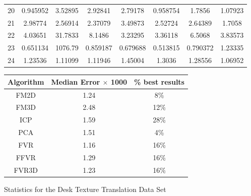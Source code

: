 \begin{figure}
\begin{tabular}{cccccccc}
20 & 0.945952 & 3.52895 & 2.92841 & 2.79178 & 0.958754 & 1.7856 & 1.07923\\
21 & 2.98774 & 2.56914 & 2.37079 & 3.49873 & 2.52724 & 2.64389 & 1.7058\\
22 & 4.03651 & 31.7833 & 8.1486 & 3.23295 & 3.36118 & 6.5068 & 3.83573\\
23 & 0.651134 & 1076.79 & 0.859187 & 0.679688 & 0.513815 & 0.790372 & 1.23335\\
24 & 1.23536 & 1.11099 & 1.11946 & 1.45004 & 1.3036 & 1.28556 & 1.06952\\
\end{tabular}
\vspace{10mm}
\centering
\begin{tabular}{ccc}
\hline
\textbf{Algorithm} & \textbf{Median Error $\times$ 1000} & \textbf{\% best results}\\ \hline
FM2D	& 1.24 & 8\%\\
FM3D	& 2.48 & 12\%\\
ICP	& 1.59 & 28\%\\
PCA	& 1.51 & 4\%\\
FVR	& 1.16 & 16\%\\
FFVR	& 1.29 & 16\%\\
FVR3D	& 1.23 & 16\%\\
\end{tabular}
\caption{Statistics for the Desk Texture Translation Data Set}
\label{tab:desktexturetranslation}
\end{figure} 




